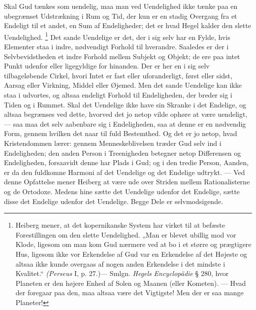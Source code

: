 \documentclass[12pt,a4paper,openany]{book}
\newcommand{\opage}[1]{\marginnote{\footnotesize\textit{[#1]}}}
\begin{document}
Skal Gud tænkes som uendelig, maa man ved Uendelighed ikke tænke paa en
ubegrænset Udstrækning i Rum og Tid, der kun er en stadig Overgang fra et
Endeligt til et andet, en Sum af Endeligheder; det er hvad Hegel kalder den
slette Uendelighed.%
\footnote[1]{Heiberg mener, at det kopernikanske System har virket til at
befæste Forestillingen om den slette Uendelighed. „Man er blevet ubillig mod
vor Klode, ligesom om man kom Gud nærmere ved at bo i et større og prægtigere
Hus, ligesom ikke vor Erkendelse af Gud var en Erkendelse af det Højeste og
altsaa ikke kunde overgaas af nogen anden Erkendelse i det mindste i Kvalitet.“
\textit{(Perseus} I, p. 27.)--- Smlgn. \emph{Hegels} \textit{Encyclopädie} §
280, hvor Planeten er den højere Enhed af Solen og Maanen (eller Kometen). ---
Hvad der foregaar paa den, maa altsaa være det Vigtigste! Men der er saa mange
Planeter!} Det sande Uendelige er det, der i sig selv
\setcounter{footnote}{0}%
\opage{135}har en Fylde, hvis Elementer staa i indre, nødvendigt Forhold til
hverandre. Saaledes er der i Selvbevidstheden et indre Forhold mellem Subjekt
og Objekt; de ere paa intet Punkt udenfor eller ligegyldige for hinanden. Der
er her en i sig selv tilbageløbende Cirkel, hvori Intet er fast eller
uforanderligt, først eller sidst, Aarsag eller Virkning, Middel eller Øjemed.
Men det sande Uendelige kan ikke staa i udvortes, og altsaa endeligt Forhold
til Endeligheden, der breder sig i Tiden og i Rummet. Skal det Uendelige ikke
have sin Skranke i det Endelige, og altsaa begrænses ved dette, hvorved det jo
netop vilde ophøre at være uendeligt, --- saa maa det selv aabenbare sig i
Endeligheden, saa at denne er en nødvendig Form, gennem hvilken det naar til
fuld Bestemthed. Og det er jo netop, hvad Kristendommen lærer: gennem
Menneskeblivelsen træder Gud selv ind i Endeligheden; den anden Person i
Treenigheden betegner netop Differensen og Endeligheden, forsaavidt denne har
Plads i Gud; og i den tredie Person, Aanden, er da den fuldkomne Harmoni af det
Uendelige og det Endelige udtrykt. --- Ved denne Opfattelse mener Heiberg at
være ude over Striden mellem Rationalisterne og de Ortodoxe. Medens hine sætte
det Uendelige udenfor det Endelige, sætte disse det Endelige udenfor det
Uendelige. Begge Dele er selvmodsigende.
\end{document}
